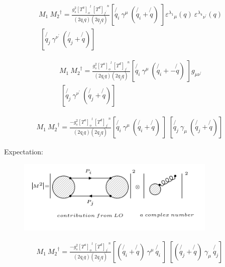 \begin{equation}
\begin{split}
M_1\: {M_2}^{\dagger} = \frac{g_s^2 {[T^a]_o}^l \:{[T^d]_{f^{\prime}}}^n }{(2q_i q)(2q_j q)} [\not{q_i}\: \gamma^{\mu} \: (\not{q_i} + \not{q})\: ]{\varepsilon^{\lambda_1}}_{\mu} (q) \: {\varepsilon^{\lambda_4}}_{{\nu}^{\prime}} (q) \\
\:[\not{q_j} \:\gamma^{{\nu}^{\prime}} \: (\not{q_j} + \not{q})]\:
\end{split}
\end{equation}

\begin{equation}
\begin{split}
M_1\: {M_2}^{\dagger} = \frac{g_s^2 {[T^a]_o}^l \:{[T^d]_{f^{\prime}}}^n }{(2q_i q)(2q_j q)} [\not{q_i}\: \gamma^{\mu} \: (\not{q_i} + -\not{q})\: ] g_{{\mu}{{\nu}^{\prime}}} \\
\:[\not{q_j} \:\gamma^{{\nu}^{\prime}} \: (\not{q_j} + \not{q})]\:
\end{split}
\end{equation}



\begin{equation}
\begin{split}
M_1\: {M_2}^{\dagger} = \frac{-g_s^2 {[T^a]_o}^l \:{[T^d]_{f^{\prime}}}^n }{(2q_i q)(2q_j q)} [\not{q_i}\: \gamma^{\mu} \: (\not{q_i} + \not{q})\: ]
\:[\not{q_j} \:\gamma_{\mu} \: (\not{q_j} + \not{q})]\:
\end{split}
\end{equation}

Expectation:
\begin{figure}[h!]
\centering
\includegraphics[width=0.85\textwidth]{images/expectationM1M2dagger.png}
\end{figure}


\begin{equation}
\begin{split}
M_1\: {M_2}^{\dagger} = \frac{-g_s^2 {[T^a]_o}^l \:{[T^d]_{f^{\prime}}}^n }{(2q_i q)(2q_j q)} [(\not{q_i} + \not{q})\: \gamma^{\mu} \:  \not{q_i}\:]
\:[(\not{q_j} + \not{q}) \:\gamma_{\mu} \:\not{q_j} ]\:
\end{split}
\end{equation}


